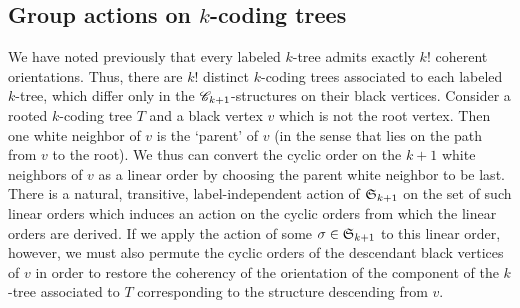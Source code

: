 \documentclass[sectionflow,singlespace,twoside,boldmathhdr,draft]{brandiss} %
\numberwithin{section}{chapter}
\numberwithin{figure}{chapter}
\begin{document}
\subsection{Group actions on $k$-coding trees}\label{ss:actct}

We have noted previously that every labeled $k$-tree admits exactly $k!$ coherent orientations.
Thus, there are $k!$ distinct $k$-coding trees associated to each labeled $k$-tree, which differ only in the $\mathscr{C}_{k+1}$-structures on their black vertices.
Consider a rooted $k$-coding tree $T$ and a black vertex $v$ which is not the root vertex.
Then one white neighbor of $v$ is the `parent' of $v$ (in the sense that lies on the path from $v$ to the root).
We thus can convert the cyclic order on the $k+1$ white neighbors of $v$ as a linear order by choosing the parent white neighbor to be last.
There is a natural, transitive, label-independent action of $ \mathfrak{S}_{k+1} $ on the set of such linear orders which induces an action on the cyclic orders from which the linear orders are derived.
If we apply the action of some $\sigma \in  \mathfrak{S}_{k+1} $ to this linear order, however, we must also permute the cyclic orders of the descendant black vertices of $v$ in order to restore the coherency of the orientation of the component of the $k$-tree associated to $T$ corresponding to the structure descending from $v$.
\end{document}
